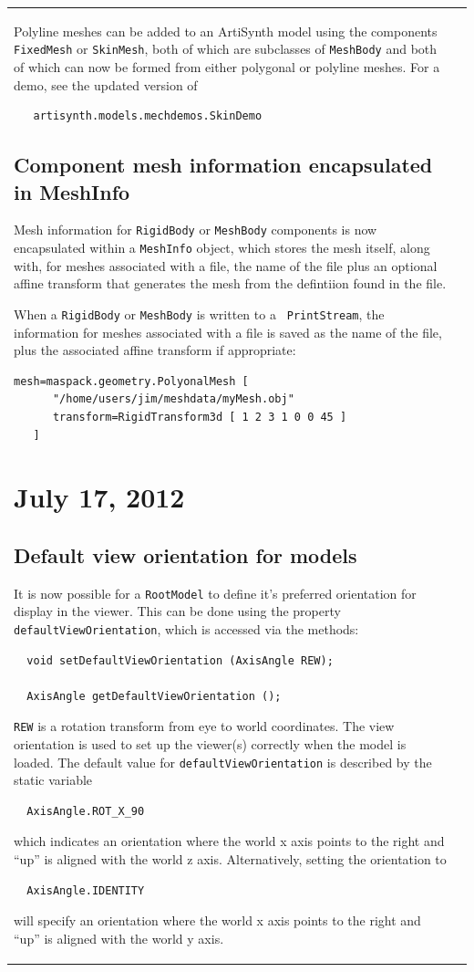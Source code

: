 \documentclass{article}
\begin{document}
\begin{tabular}{ll}
Polyline meshes can be added to an ArtiSynth model using the
components {\tt FixedMesh} or {\tt SkinMesh}, both of which are
subclasses of {\tt MeshBody} and both of which can now be formed from
either polygonal or polyline meshes.  For a demo, see the updated
version of
\begin{verbatim}
   artisynth.models.mechdemos.SkinDemo
\end{verbatim}

\subsection*{Component mesh information encapsulated in MeshInfo}

Mesh information for {\tt RigidBody} or {\tt MeshBody} components is
now encapsulated within a {\tt MeshInfo} object, which stores the mesh
itself, along with, for meshes associated with a file, the name of the
file plus an optional affine transform that generates the mesh from
the defintiion found in the file.

When a {\tt RigidBody} or {\tt MeshBody} is written to a {\tt
PrintStream}, the information for meshes associated with a file is
saved as the name of the file, plus the associated affine transform if
appropriate:
\begin{lstlisting}[]
   mesh=maspack.geometry.PolyonalMesh [
      "/home/users/jim/meshdata/myMesh.obj"
      transform=RigidTransform3d [ 1 2 3 1 0 0 45 ]
   ]
\end{lstlisting}

\section*{July 17, 2012}

\subsection*{Default view orientation for models}

It is now possible for a {\tt RootModel} to define it's preferred
orientation for display in the viewer. This can be done using the
property {\tt defaultViewOrientation}, which is accessed
via the methods:
\begin{verbatim}
  void setDefaultViewOrientation (AxisAngle REW);

  AxisAngle getDefaultViewOrientation ();
\end{verbatim}
{\tt REW} is a rotation transform from eye to world coordinates.  The
view orientation is used to set up the viewer(s) correctly when the
model is loaded. The default value for {\tt defaultViewOrientation} is
described by the static variable
\begin{verbatim}
  AxisAngle.ROT_X_90
\end{verbatim}
which indicates an orientation where the world x axis points to the 
right and ``up'' is aligned with the world z axis. Alternatively,
setting the orientation to 
\begin{verbatim}
  AxisAngle.IDENTITY
\end{verbatim}
will specify an orientation where the world x axis points to the
right and ``up'' is aligned with the world y axis.


\end{tabular}
\end{document}
